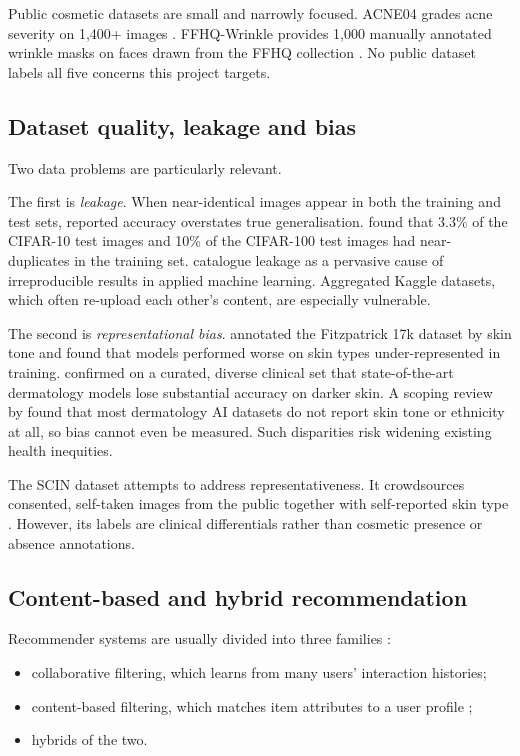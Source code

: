 Public cosmetic datasets are small and narrowly focused. ACNE04 grades acne severity on 1,400+ images \citep{wu2019acne}. FFHQ-Wrinkle provides 1,000 manually annotated wrinkle masks on faces drawn from the FFHQ collection \citep{moon2024,karras2021}. No public dataset labels all five concerns this project targets.

\subsection*{Dataset quality, leakage and bias}

Two data problems are particularly relevant.

The first is \emph{leakage}. When near-identical images appear in both the training and test sets, reported accuracy overstates true generalisation. \citet{barz2020} found that 3.3\% of the CIFAR-10 test images and 10\% of the CIFAR-100 test images had near-duplicates in the training set. \citet{kapoor2023} catalogue leakage as a pervasive cause of irreproducible results in applied machine learning. Aggregated Kaggle datasets, which often re-upload each other's content, are especially vulnerable.

The second is \emph{representational bias}. \citet{groh2021} annotated the Fitzpatrick 17k dataset by skin tone and found that models performed worse on skin types under-represented in training. \citet{daneshjou2022} confirmed on a curated, diverse clinical set that state-of-the-art dermatology models lose substantial accuracy on darker skin. A scoping review by \citet{daneshjou2021} found that most dermatology AI datasets do not report skin tone or ethnicity at all, so bias cannot even be measured. Such disparities risk widening existing health inequities.

The SCIN dataset attempts to address representativeness. It crowdsources consented, self-taken images from the public together with self-reported skin type \citep{ward2024}. However, its labels are clinical differentials rather than cosmetic presence or absence annotations.

\subsection*{Content-based and hybrid recommendation}

Recommender systems are usually divided into three families \citep{ricci2022,roy2022}:
\begin{itemize}
  \item collaborative filtering, which learns from many users' interaction histories;
  \item content-based filtering, which matches item attributes to a user profile \citep{roy2022};
  \item hybrids of the two.
\end{itemize}


